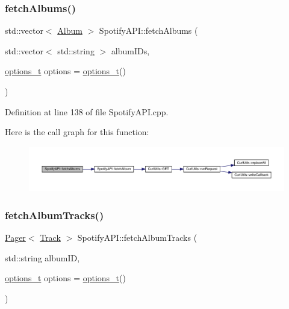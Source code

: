 \subsubsection{\texorpdfstring{fetch\+Albums()}{fetchAlbums()}}
{\footnotesize\ttfamily std\+::vector$<$ \mbox{\hyperlink{class_album}{Album}} $>$ Spotify\+A\+P\+I\+::fetch\+Albums (\begin{DoxyParamCaption}\item[{std\+::vector$<$ std\+::string $>$}]{album\+I\+Ds,  }\item[{\mbox{\hyperlink{_spotify_a_p_i_8h_a0ff5cac1a4007bb330b7d9939650c283}{options\+\_\+t}}}]{options = {\ttfamily \mbox{\hyperlink{_spotify_a_p_i_8h_a0ff5cac1a4007bb330b7d9939650c283}{options\+\_\+t}}()} }\end{DoxyParamCaption})}



Definition at line 138 of file Spotify\+A\+P\+I.\+cpp.

Here is the call graph for this function\+:
\nopagebreak
\begin{figure}[H]
\begin{center}
\leavevmode
\includegraphics[width=350pt]{class_spotify_a_p_i_ac2ec43ab2e207f7422c59f235cb2831f_cgraph}
\end{center}
\end{figure}
\mbox{\label{class_spotify_a_p_i_a3e007d4199f40cd6227613d28319c175}} 
\subsubsection{\texorpdfstring{fetch\+Album\+Tracks()}{fetchAlbumTracks()}}
{\footnotesize\ttfamily \mbox{\hyperlink{class_pager}{Pager}}$<$ \mbox{\hyperlink{class_track}{Track}} $>$ Spotify\+A\+P\+I\+::fetch\+Album\+Tracks (\begin{DoxyParamCaption}\item[{std\+::string}]{album\+ID,  }\item[{\mbox{\hyperlink{_spotify_a_p_i_8h_a0ff5cac1a4007bb330b7d9939650c283}{options\+\_\+t}}}]{options = {\ttfamily \mbox{\hyperlink{_spotify_a_p_i_8h_a0ff5cac1a4007bb330b7d9939650c283}{options\+\_\+t}}()} }\end{DoxyParamCaption})}



